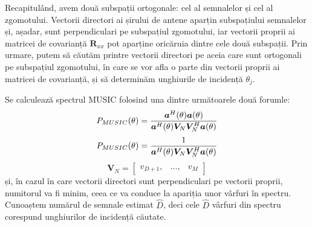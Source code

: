 Recapitulând, avem două subspații ortogonale: cel al semnalelor și cel al
zgomotului. Vectorii directori ai șirului de antene aparțin subspațiului
semnalelor și, așadar, sunt perpendiculari pe subspațiul zgomotului, iar
vectorii proprii ai matricei de covarianță $\bm{R}_{xx}$ pot aparține oricăruia
dintre cele două subspații. Prin urmare, putem să căutăm printre vectorii
directori pe aceia care sunt ortogonali pe subspațiul zgomotului, în care se vor
afla o parte din vectorii proprii ai matricei de covarianță, și să determinăm
unghiurile de incidență $\theta_j$.

Se calculează spectrul MUSIC folosind una dintre următoarele două forumle:
\begin{equation}
    P_{MUSIC}(\theta) =
        \frac{\bm{a}^H(\theta)\bm{a}(\theta)}
             {\bm{a}^H(\theta)\bm{V}_N\bm{V}_N^H\bm{a}(\theta)} \\
\end{equation}
\begin{equation}
    P_{MUSIC}(\theta) =
        \frac{1}
             {\bm{a}^H(\theta)\bm{V}_N\bm{V}_N^H\bm{a}(\theta)} \\
\label{eq:music-spectrum}
\end{equation}
\begin{equation}
    \bm{V}_N = \begin{bmatrix}v_{D+1}, & ..., & v_M \end{bmatrix}
\end{equation}
și, în cazul în care vectorii directori sunt perpendiculari pe vectorii proprii,
numitorul va fi minim, ceea ce va conduce la apariția unor vârfuri în spectru.
Cunoaștem numărul de semnale estimat $\hat{D}$, deci cele $\hat{D}$
vârfuri din spectru corespund unghiurilor de incidență căutate.
